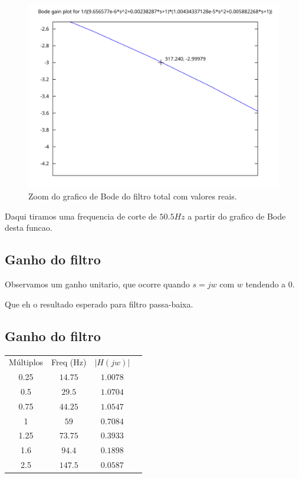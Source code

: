 \documentclass[12pt,twoside, a4paper, twocolumn]{article}
\begin{document}
\begin{figure}[h]
    \centering
    \includegraphics[width=1\columnwidth]{images/zoomHtotal.png}
    \caption{Zoom do grafico de Bode do filtro total com valores reais.}
\end{figure}

Daqui tiramos uma frequencia de corte de $50.5Hz$ a partir do grafico de Bode desta funcao.


\pagebreak

\subsection{Ganho do filtro}

Observamos um ganho unitario, que ocorre quando $s = jw$ com $w$ tendendo a $0$.

Que eh o resultado esperado para filtro passa-baixa.


\subsection{Ganho do filtro}

\begin{center}
    \begin{tabular}{ |c|c|c|c| }
        \hline
        Múltiplos & Freq (Hz) & $\left| H(jw) \right|$ \\
        0.25      & $14.75$   & $1.0078$               \\
        0.5       & $29.5$    & $1.0704$               \\
        0.75      & $44.25$   & $1.0547$               \\
        1         & $59$      & $0.7084$               \\
        1.25      & $73.75$   & $0.3933$               \\
        1.6       & $94.4$    & $0.1898$               \\
        2.5       & $147.5$   & $0.0587$               \\
        \hline
    \end{tabular}
\end{center}
\end{document}
